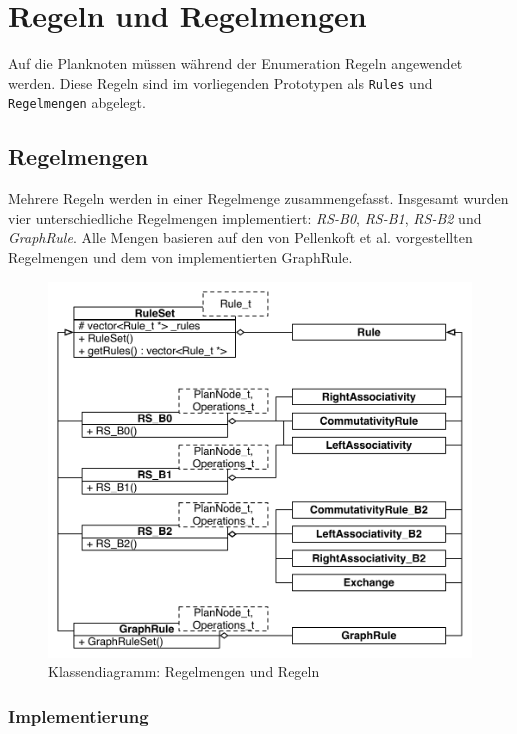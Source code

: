 \section{Regeln und Regelmengen}
Auf die Planknoten müssen während der Enumeration Regeln angewendet werden. Diese Regeln sind im vorliegenden Prototypen als \texttt{Rules} und \texttt{Regelmengen} abgelegt.

\subsection{Regelmengen}
Mehrere Regeln werden in einer Regelmenge zusammengefasst.
Insgesamt wurden vier unterschiedliche Regelmengen implementiert: \textit{RS-B0}, \textit{RS-B1}, \textit{RS-B2} und \textit{GraphRule}.
Alle Mengen basieren auf den von Pellenkoft et al. vorgestellten Regelmengen und dem von \cite{shanbhag2014optimizing} implementierten GraphRule.

\begin{figure}[ht]
  \centering
  \includegraphics[scale=0.75]{04_Implementierung/00_media/RuleSets.pdf}
  \caption{Klassendiagramm: Regelmengen und Regeln}
  \label{RuleSetClass}
\end{figure}

\subsubsection{Implementierung}
\label{sec:RuleImplementation}

